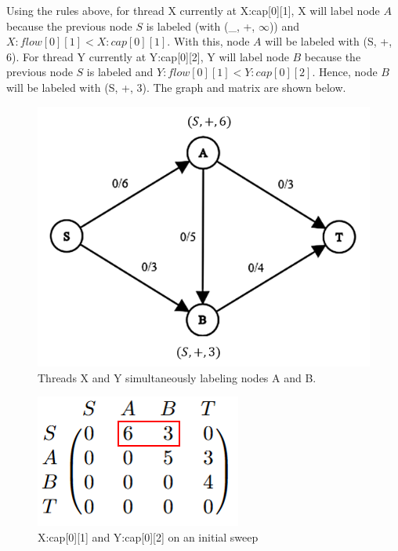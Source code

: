         Using the rules above, for thread X currently at X:cap[0][1], X will label node $A$ because the previous node $S$ is labeled (with (\_, +, $\infty$)) and $X:flow[0][1] < X:cap[0][1]$. With this, node $A$ will be labeled with (S, +, 6). For thread Y currently at Y:cap[0][2], Y will label node $B$ because the previous node $S$ is labeled and $Y:flow[0][1] < Y:cap[0][2]$. Hence, node $B$ will be labeled with (S, +, 3). The graph and matrix are shown below.
        
        
        
        \begin{figure}[H]
            \centering
            \includegraphics[scale=.5]{figures/nodeAandB.png}
            \caption{Threads X and Y simultaneously labeling nodes A and B.}
            \label{fig:Sweep}
        \end{figure}
        \begin{figure}[H]
            \centering
            \includegraphics[scale=.5]{figures/Sweep.png}
            \caption{X:cap[0][1] and Y:cap[0][2] on an initial sweep}
            \label{fig:Sweep}
        \end{figure}
        
